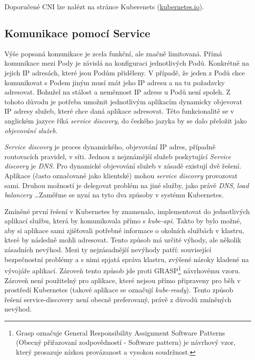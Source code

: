 \cite{thekubernetesauthors_2022_cluster} 
Doporučené CNI lze nalézt na stránce Kuberenets (\href{https://kubernetes.io/docs/concepts/cluster-administration/addons/#networking-and-network-policy}{kubernetes.io}).

\subsection{Komunikace pomocí Service}
Výše popsaná komunikace je zcela funkční, ale značně limitovaná. Přímá komunikace mezi Pody je závislá na konfiguraci jednotlivých Podů. Konkrétně na jejich IP adresách, které jsou Podům přiděleny. V případě, že jeden z Podů chce komunikovat s Podem jiným musí znát jeho IP adresu a na tu požadavky adresovat. Bohužel na stálost a neměnnost IP adress u Podů není spoleh. Z tohoto důvodu je potřeba umožnit jednotlivým aplikacím dynamicky objevovat IP adresy služeb, které chce daná aplikace adresovat. Této funkcionalitě se v anglickém jazyce říká \textit{service discovry}, do českého jazyka by se dalo přeložit jako \textit{objevování služeb}. 

\textit{Service discovry} je proces dynamického, objevování IP adres, případně routovacích pravidel, v síti. Jednou z nejznámější služeb poskytující \textit{Service discovry} je \textit{DNS}. Pro dynamické objevování služeb v zásadě existují dvě řešení. Aplikace (často označované jako klientské) mohou \textit{service discovry} provozovat sami. Druhou možností je delegovat problém na jiné služby, jako právě \textit{DNS}, \textit{load balancery} \ldots Zaměřme se nyní na tyto dva způsoby v systému Kubernetes. 

Zmíněné první řešení v Kubernetes by znamenalo, implementovat do jednotlivých aplikací službu, která by komunikovala přímo s \textit{kube-api}. Takto by bylo možné, aby si aplikace sami zjišťovali potřebné informace o okolních službách v klastru, které by následně mohli adresovat. Tento způsob má určité výhody, ale několik zásadních nevýhod. Mezi ty nejzásadnější nevýhody patří: související bezpečnostní problémy a s nimi spjatá správa klastru, zvýšené nároky kladené na vývojáře aplikací. Zároveň tento způsob jde proti GRASP\footnote{Grasp označuje General Responsibility Assignment Software Patterns (Obecný přiřazovaní zodpovědností - Software pattern) je návrhový vzor, který prosazuje nízkou provázanost a vysokou soudržnost.\cite{mlejnek_2018_architektonick}} návrhovému vzoru. Zároveň není použitelný pro aplikace, které nejsou přímo připraveny pro běh v prostředí Kubernetes (takové aplikace se označují \textit{kube-ready}). Tento způsob řešení service-discovery není obecně preferovaný, právě z důvodů zmíněných nevýhod.


